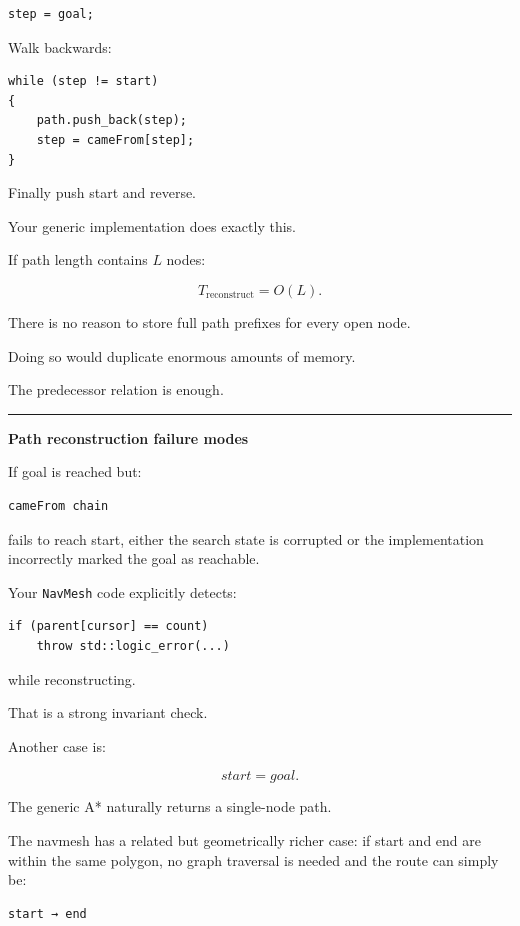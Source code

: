 \begin{verbatim}
step = goal;
\end{verbatim}

Walk backwards:

\begin{verbatim}
while (step != start)
{
    path.push_back(step);
    step = cameFrom[step];
}
\end{verbatim}

Finally push start and reverse.

Your generic implementation does exactly this.

If path length contains \(L\) nodes:

\[
T_{\text{reconstruct}}
=
O(L).
\]

There is no reason to store full path prefixes for every open node.

Doing so would duplicate enormous amounts of memory.

The predecessor relation is enough.

\begin{center}\rule{0.5\linewidth}{0.5pt}\end{center}

\textbf{Path reconstruction failure modes}

If goal is reached but:

\begin{verbatim}
cameFrom chain
\end{verbatim}

fails to reach start, either the search state is corrupted or the implementation incorrectly marked the goal as reachable.

Your \texttt{NavMesh} code explicitly detects:

\begin{verbatim}
if (parent[cursor] == count)
    throw std::logic_error(...)
\end{verbatim}

while reconstructing.

That is a strong invariant check.

Another case is:

\[
start=goal.
\]

The generic A* naturally returns a single-node path.

The navmesh has a related but geometrically richer case: if start and end are within the same polygon, no graph traversal is needed and the route can simply be:

\begin{verbatim}
start → end
\end{verbatim}

